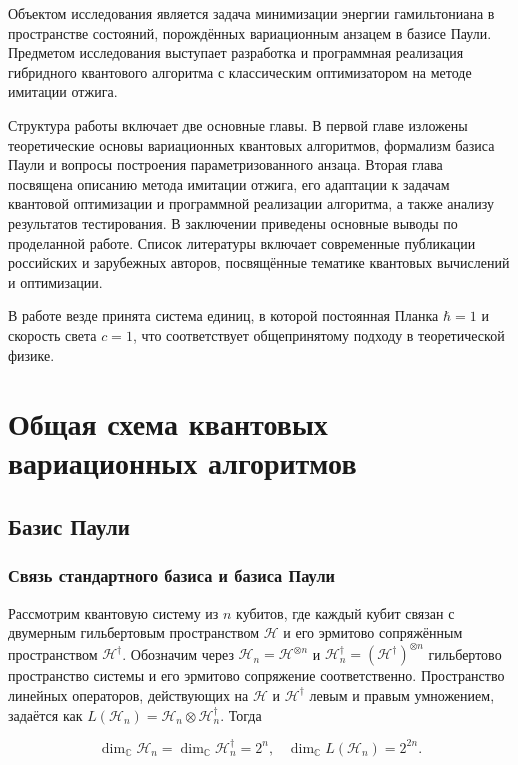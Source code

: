 \documentclass[a4paper]{report}
\begin{document}
Объектом исследования является задача минимизации энергии гамильтониана в пространстве состояний, порождённых вариационным анзацем в базисе Паули. Предметом исследования выступает разработка и программная реализация гибридного квантового алгоритма с классическим оптимизатором на методе имитации отжига.

Структура работы включает две основные главы. В первой главе изложены теоретические основы вариационных квантовых алгоритмов, формализм базиса Паули и вопросы построения параметризованного анзаца. Вторая глава посвящена описанию метода имитации отжига, его адаптации к задачам квантовой оптимизации и программной реализации алгоритма, а также анализу результатов тестирования. В заключении приведены основные выводы по проделанной работе. Список литературы включает современные публикации российских и зарубежных авторов, посвящённые тематике квантовых вычислений и оптимизации.

В работе везде принята система единиц, в которой постоянная Планка $\hbar=1$ и скорость света $c=1$, что соответствует общепринятому подходу в теоретической физике.


\chapter{Общая схема квантовых вариационных алгоритмов}

\section{Базис Паули}
\subsection{Связь стандартного базиса и базиса \mbox{Паули}}

Рассмотрим квантовую систему из ${n}$ кубитов, где каждый кубит связан с двумерным гильбертовым пространством ${\mathcal{H}}$ и его эрмитово сопряжённым пространством ${\mathcal{H}^\dagger}$. Обозначим через ${\mathcal{H}_n = \mathcal{H}^{\otimes n}}$ и ${\mathcal{H}_n^\dagger = (\mathcal{H}^\dagger)^{\otimes n}}$ гильбертово пространство системы и его эрмитово сопряжение соответственно. Пространство линейных операторов, действующих на ${\mathcal{H}}$ и ${\mathcal{H}^\dagger}$ левым и правым умножением, задаётся как ${L(\mathcal{H}_n) = \mathcal{H}_n \otimes \mathcal{H}_n^\dagger}$. Тогда

$${\dim_\mathbb{C} \mathcal{H}_n = \dim_\mathbb{C} \mathcal{H}_n^\dagger = 2^n,\;\;\;
            \dim_\mathbb{C} L(\mathcal{H}_n) = 2^{2n}.}$$
\end{document}
